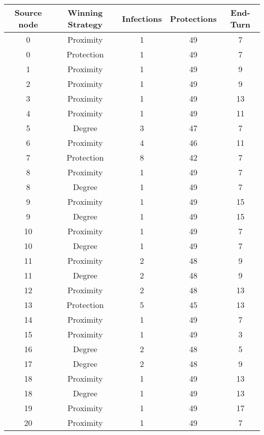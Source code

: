 \documentclass[results.tex]{subfiles}
\begin{document}
\begin{center}
  \begin{tabular}{| c || c | c | c | c |}
    \hline
    {\bfseries Source node} & {\bfseries Winning Strategy} & {\bfseries Infections} & {\bfseries Protections} & {\bfseries End-Turn} \\  %
    \hline\hline
    0 & Proximity & 1 & 49 & 7 \\ 
    \hline
    0 & Protection & 1 & 49 & 7 \\ 
    \hline
    1 & Proximity & 1 & 49 & 9 \\ 
    \hline
    2 & Proximity & 1 & 49 & 9 \\ 
    \hline
    3 & Proximity & 1 & 49 & 13 \\ 
    \hline
    4 & Proximity & 1 & 49 & 11 \\ 
    \hline
    5 & Degree & 3 & 47 & 7 \\ 
    \hline
    6 & Proximity & 4 & 46 & 11 \\ 
    \hline
    7 & Protection & 8 & 42 & 7 \\ 
    \hline
    8 & Proximity & 1 & 49 & 7 \\ 
    \hline
    8 & Degree & 1 & 49 & 7 \\ 
    \hline
    9 & Proximity & 1 & 49 & 15 \\ 
    \hline
    9 & Degree & 1 & 49 & 15 \\ 
    \hline
    10 & Proximity & 1 & 49 & 7 \\ 
    \hline
    10 & Degree & 1 & 49 & 7 \\ 
    \hline
    11 & Proximity & 2 & 48 & 9 \\ 
    \hline
    11 & Degree & 2 & 48 & 9 \\ 
    \hline
    12 & Proximity & 2 & 48 & 13 \\ 
    \hline
    13 & Protection & 5 & 45 & 13 \\ 
    \hline
    14 & Proximity & 1 & 49 & 7 \\ 
    \hline
    15 & Proximity & 1 & 49 & 3 \\ 
    \hline
    16 & Degree & 2 & 48 & 5 \\ 
    \hline
    17 & Degree & 2 & 48 & 9 \\ 
    \hline
    18 & Proximity & 1 & 49 & 13 \\ 
    \hline
    18 & Degree & 1 & 49 & 13 \\ 
    \hline
    19 & Proximity & 1 & 49 & 17 \\ 
    \hline
    20 & Proximity & 1 & 49 & 7 \\ 

\end{tabular}
\end{center}
\end{document}
